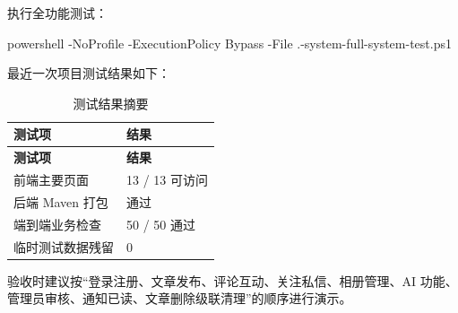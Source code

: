 \documentclass[UTF8,a4paper,12pt]{ctexart}
\begin{document}
执行全功能测试：

\begin{codeblock}
powershell -NoProfile -ExecutionPolicy Bypass -File .\blog-system\tests\run-full-system-test.ps1
\end{codeblock}

最近一次项目测试结果如下：

\begin{longtable}{p{6cm}p{7cm}}
\caption{测试结果摘要}\\
\toprule
\rowcolor{tablehead}\textbf{测试项} & \textbf{结果}\\
\midrule
\endfirsthead
\toprule
\rowcolor{tablehead}\textbf{测试项} & \textbf{结果}\\
\midrule
\endhead
前端主要页面 & 13 / 13 可访问\\
后端 Maven 打包 & 通过\\
端到端业务检查 & 50 / 50 通过\\
临时测试数据残留 & 0\\
\bottomrule
\end{longtable}

验收时建议按“登录注册、文章发布、评论互动、关注私信、相册管理、AI 功能、管理员审核、通知已读、文章删除级联清理”的顺序进行演示。
\end{document}
